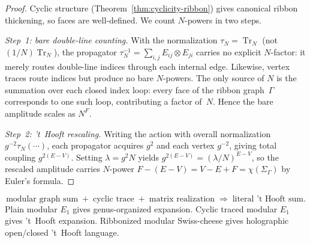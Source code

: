 \begin{proof}
Cyclic structure
\textup{(}Theorem~\textup{\ref{thm:cyclicity-ribbon}}\textup{)}
gives canonical ribbon thickening, so faces are
well-defined. We count $N$-powers in two steps.

\emph{Step~1: bare double-line counting.} With the
normalization $\tau_N = \operatorname{Tr}_N$ (not
$(1/N)\operatorname{Tr}_N$), the propagator
$\tau_N^{-1} = \sum_{i,j} E_{ij}\otimes E_{ji}$
carries no explicit $N$-factor: it merely routes
double-line indices through each internal edge.
Likewise, vertex traces route indices but produce no
bare $N$-powers. The only source of $N$ is the
summation over each closed index loop: every face of
the ribbon graph~$\Gamma$ corresponds to one such
loop, contributing a factor of~$N$. Hence the bare
amplitude scales as $N^F$.

\emph{Step~2: 't~Hooft rescaling.} Writing the action
with overall normalization $g^{-2}\tau_N(\cdots)$,
each propagator acquires $g^2$ and each vertex
$g^{-2}$, giving total coupling $g^{2(E-V)}$.
Setting $\lambda = g^2 N$ yields
$g^{2(E-V)} = (\lambda/N)^{E-V}$, so the rescaled
amplitude carries $N$-power $F - (E - V) = V - E + F
= \chi(\Sigma_\Gamma)$ by Euler's formula.
\end{proof}

\begin{remark}%
\label{rem:thooft-logical-chain}%
%
\begin{equation}\label{eq:thooft-chain}
\text{modular graph sum}
\;+\;
\text{cyclic trace}
\;+\;
\text{matrix realization}
\;\Longrightarrow\;
\text{literal 't~Hooft sum.}
\end{equation}
Plain modular $E_1$ gives genus-organized expansion.
Cyclic traced modular $E_1$ gives 't~Hooft expansion.
Ribbonized modular Swiss-cheese gives holographic
open/closed 't~Hooft language.
\end{remark}

